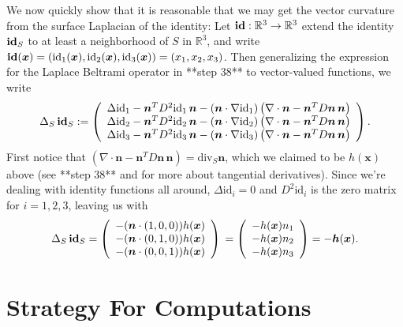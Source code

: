 \documentclass[10pt]{article}
\newcommand{\R}{\mathbb{R}}
\newcommand{\mbf}[1]{\boldsymbol{#1}}
\begin{document}
We now quickly show that it is reasonable that we may get the vector curvature
from the surface Laplacian of the identity: Let $\text{\bf id} : \R^3 \to \R^3$
extend the identity $\text{\bf id}_S$ to at least a neighborhood of $S$ in $\R^3$, and write $\text{\bf
id}(\mbf{x}) = \left( \text{id}_1(\mbf{x}), \text{id}_2(\mbf{x}),\text{id}_3(\mbf{x}) \right) = \left( x_1, x_2, x_3 \right)$. Then generalizing the
expression for the Laplace Beltrami operator in **step 38** to vector-valued
functions, we write
\[
 \Delta_S \, \text{\bf id}_S :=
  \left( \begin{array}{c} 
     \Delta \text{id}_1  - \mbf{n}^T D^2 \text{id}_1 \, \mbf{n} - (\mbf{n} \cdot \nabla \text{id}_1)\left( \nabla \cdot \mbf{n} - \mbf{n}^T D\mbf{n} \, \mbf{n} \right) \\ 
     \Delta \text{id}_2  - \mbf{n}^T D^2 \text{id}_2 \, \mbf{n} - (\mbf{n} \cdot \nabla \text{id}_2)\left( \nabla \cdot \mbf{n} - \mbf{n}^T D\mbf{n} \, \mbf{n} \right) \\ 
     \Delta \text{id}_3  - \mbf{n}^T D^2 \text{id}_3 \, \mbf{n} - (\mbf{n} \cdot \nabla \text{id}_3)\left( \nabla \cdot \mbf{n} - \mbf{n}^T D\mbf{n} \, \mbf{n} \right) 
  \end{array} \right). 
\]
First notice that $\left( \nabla \cdot \mbf{n} - \mbf{n}^T D\mbf{n} \, \mbf{n}
\right) = \text{div}_{S} \mbf{n}$, which we claimed to be $h(\mbf{x})$ above
(see **step 38** and \cite{} for more about tangential derivatives).  Since
we're dealing with identity functions all around, $\Delta \text{id}_i = 0$ and
$D^2 \text{id}_i$ is the zero matrix for $i=1,2,3$, leaving us with 
\[
 \Delta_S \, \text{\bf id}_S =
  \left( \begin{array}{c} 
     - (\mbf{n} \cdot \left( 1,0,0 \right)) h(\mbf{x})  \\ 
     - (\mbf{n} \cdot \left( 0,1,0 \right)) h(\mbf{x})  \\ 
     - (\mbf{n} \cdot \left( 0,0,1 \right)) h(\mbf{x}) 
  \end{array} \right) \\
  = 
  \left( \begin{array}{c} 
     - h(\mbf{x}) n_1  \\ 
     - h(\mbf{x}) n_2  \\ 
     - h(\mbf{x}) n_3 
  \end{array} \right) 
  = - \mbf{h}(\mbf{x}).
\]

\section*{Strategy For Computations}
\end{document}
